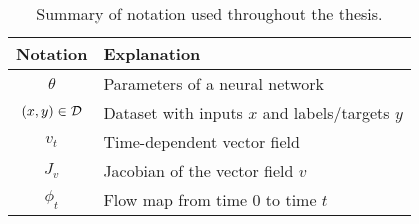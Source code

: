 \begin{table}[t!]
    \centering
    \begin{tabular}{cl}
        \toprule
        \textbf{Notation} & \textbf{Explanation} \\
        \midrule

        $\theta$             & Parameters of a neural network \\
        $(x,y) \in \mathcal{D}$    & Dataset with inputs $x$ and labels/targets $y$ \\
        $v_t$                & Time-dependent vector field  \\
        $J_v$                  & Jacobian of the vector field $v$ \\
        $\phi_t$             & Flow map from time 0 to time $t$ \\
        
        

        \bottomrule
    \end{tabular}
    \caption{\label{tab:notation} Summary of notation used throughout the thesis.}
\end{table}
\clearpage
